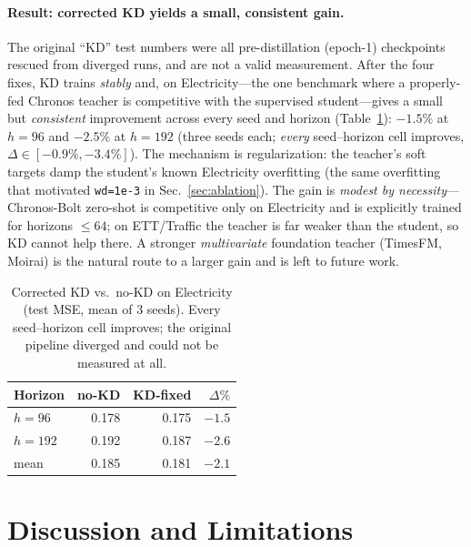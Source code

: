 \documentclass[11pt]{article}
\begin{document}
\paragraph{Result: corrected KD yields a small, consistent gain.}
The original ``KD'' test numbers were all pre-distillation (epoch-1) checkpoints
rescued from diverged runs, and are not a valid measurement. After the four
fixes, KD trains \emph{stably} and, on Electricity---the one benchmark where a
properly-fed Chronos teacher is competitive with the supervised student---gives a
small but \emph{consistent} improvement across every seed and horizon
(Table~\ref{tab:kd}): $-1.5\%$ at $h{=}96$ and $-2.5\%$ at $h{=}192$ (three seeds
each; \emph{every} seed--horizon cell improves, $\Delta\in[-0.9\%,-3.4\%]$). The
mechanism is regularization: the teacher's soft targets damp the student's known
Electricity overfitting (the same overfitting that motivated \texttt{wd=1e-3} in
Sec.~\ref{sec:ablation}). The gain is \emph{modest by necessity}---Chronos-Bolt
zero-shot is competitive only on Electricity and is explicitly trained for
horizons $\le64$; on ETT/Traffic the teacher is far weaker than the student, so KD
cannot help there. A stronger \emph{multivariate} foundation teacher (TimesFM,
Moirai) is the natural route to a larger gain and is left to future work.

\begin{table}[t]
\centering
\caption{Corrected KD vs.\ no-KD on Electricity (test MSE, mean of 3 seeds).
Every seed--horizon cell improves; the original pipeline diverged and could not
be measured at all.}
\label{tab:kd}
\small
\begin{tabular}{@{}lrrr@{}}
\toprule
Horizon & no-KD & KD-fixed & $\Delta\%$ \\
\midrule
$h{=}96$  & 0.178 & 0.175 & $-1.5$ \\
$h{=}192$ & 0.192 & 0.187 & $-2.6$ \\
\midrule
mean      & 0.185 & 0.181 & $-2.1$ \\
\bottomrule
\end{tabular}
\end{table}

\section{Discussion and Limitations}
\label{sec:limits}
\end{document}
